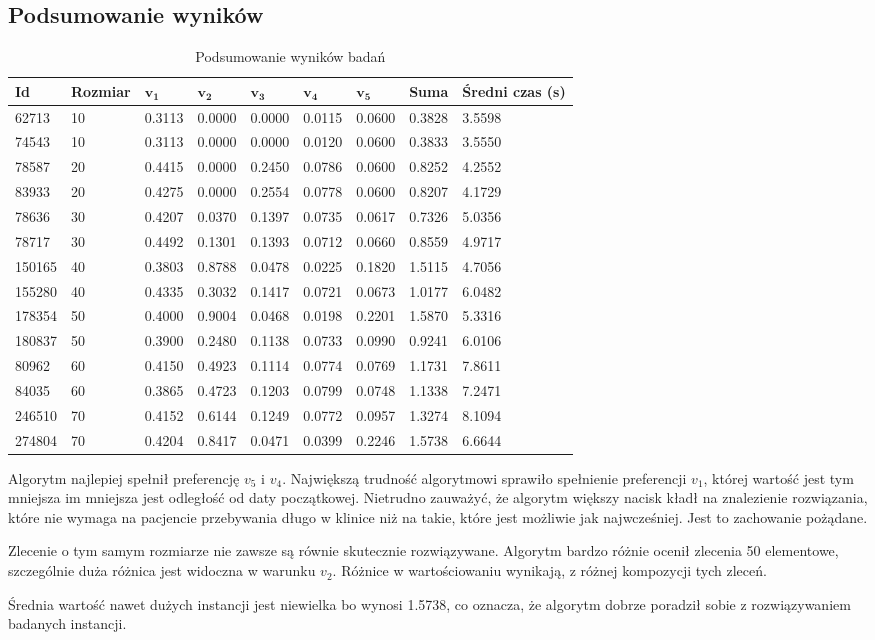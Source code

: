 \subsection{Podsumowanie wyników}
\begin{table}[H]
\centering
\begin{tabularx}{1\textwidth}{ | X | X | l | l | l | l | l | l | X | }
\hline
\bfseries Id & \bfseries Rozmiar & $\mathbf{v_1}$ & $\mathbf{v_2}$ & $\mathbf{v_3}$ & $\mathbf{v_4}$ & $\mathbf{v_5}$ & \bfseries Suma & \bfseries Średni czas (s) \\
\hline
62713 & 10 & 0.3113 & 0.0000 & 0.0000 & 0.0115 & 0.0600 & 0.3828 & 3.5598 \\
\hline
74543 & 10 & 0.3113 & 0.0000 & 0.0000 & 0.0120 & 0.0600 & 0.3833 & 3.5550 \\
\hline
78587 & 20 & 0.4415 & 0.0000 & 0.2450 & 0.0786 & 0.0600 & 0.8252 & 4.2552 \\
\hline
83933 & 20 & 0.4275 & 0.0000 & 0.2554 & 0.0778 & 0.0600 & 0.8207 & 4.1729 \\
\hline
78636 & 30 & 0.4207 & 0.0370 & 0.1397 & 0.0735 & 0.0617 & 0.7326 & 5.0356 \\
\hline
78717 & 30 & 0.4492 & 0.1301 & 0.1393 & 0.0712 & 0.0660 & 0.8559 & 4.9717 \\
\hline
150165 & 40 & 0.3803 & 0.8788 & 0.0478 & 0.0225 & 0.1820 & 1.5115 & 4.7056 \\
\hline
155280 & 40 & 0.4335 & 0.3032 & 0.1417 & 0.0721 & 0.0673 & 1.0177 & 6.0482 \\
\hline
178354 & 50 & 0.4000 & 0.9004 & 0.0468 & 0.0198 & 0.2201 & 1.5870 & 5.3316 \\
\hline
180837 & 50 & 0.3900 & 0.2480 & 0.1138 & 0.0733 & 0.0990 & 0.9241 & 6.0106 \\
\hline
80962 & 60 & 0.4150 & 0.4923 & 0.1114 & 0.0774 & 0.0769 & 1.1731 & 7.8611 \\
\hline
84035 & 60 & 0.3865 & 0.4723 & 0.1203 & 0.0799 & 0.0748 & 1.1338 & 7.2471 \\
\hline
246510 & 70 & 0.4152 & 0.6144 & 0.1249 & 0.0772 & 0.0957 & 1.3274 & 8.1094 \\
\hline
274804 & 70 & 0.4204 & 0.8417 & 0.0471 & 0.0399 & 0.2246 & 1.5738 & 6.6644 \\
\hline
\end{tabularx}
\caption{Podsumowanie wyników badań}
\end{table}
Algorytm najlepiej spełnił preferencję $v_5$ i $v_4$. Największą trudność
algorytmowi sprawiło spełnienie preferencji $v_1$, której wartość jest tym mniejsza im
mniejsza jest odległość od daty początkowej. Nietrudno zauważyć, że algorytm
większy nacisk kładł na znalezienie rozwiązania, które nie wymaga na pacjencie
przebywania długo w klinice niż na takie, które jest możliwie jak najwcześniej.
Jest to zachowanie pożądane.

Zlecenie o tym samym rozmiarze nie zawsze są równie skutecznie rozwiązywane. Algorytm bardzo różnie ocenił
zlecenia 50 elementowe, szczególnie duża różnica jest widoczna w warunku $v_2$. Różnice w wartościowaniu wynikają, z różnej
kompozycji tych zleceń.

Średnia wartość nawet dużych instancji jest niewielka bo wynosi 1.5738, co
oznacza, że algorytm dobrze poradził sobie z rozwiązywaniem badanych instancji.
